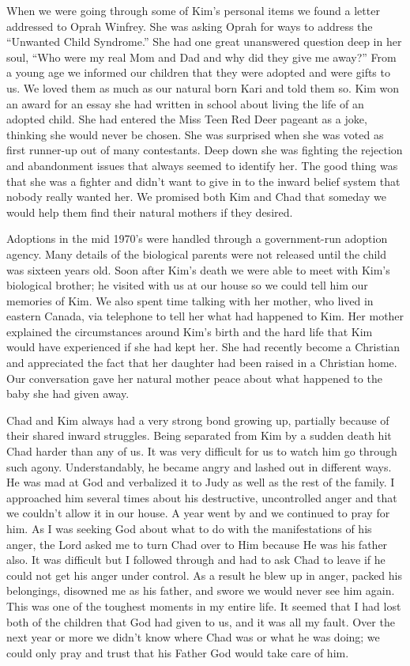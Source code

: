 \documentclass[oneside]{book}
\begin{document}
When we were going through some of Kim's personal items we found a letter addressed to Oprah Winfrey. She was asking Oprah for ways to address the “Unwanted Child Syndrome.” She had one great unanswered question deep in her soul, “Who were my real Mom and Dad and why did they give me away?” From a young age we informed our children that they were adopted and were gifts to us. We loved them as much as our natural born Kari and told them so. Kim won an award for an essay she had written in school about living the life of an adopted child. She had entered the Miss Teen Red Deer pageant as a joke, thinking she would never be chosen. She was surprised when she was voted as first runner-up out of many contestants. Deep down she was fighting the rejection and abandonment issues that always seemed to identify her. The good thing was that she was a fighter and didn't want to give in to the inward belief system that nobody really wanted her. We promised both Kim and Chad that someday we would help them find their natural mothers if they desired. 

Adoptions in the mid 1970’s were handled through a government-run adoption agency. Many details of the biological parents were not released until the child was sixteen years old. Soon after Kim’s death we were able to meet with Kim's biological brother; he visited with us at our house so we could tell him our memories of Kim. We also spent time talking with her mother, who lived in eastern Canada, via telephone to tell her what had happened to Kim. Her mother explained the circumstances around Kim’s birth and the hard life that Kim would have experienced if she had kept her. She had recently become a Christian and appreciated the fact that her daughter had been raised in a Christian home. Our conversation gave her natural mother peace about what happened to the baby she had given away.

Chad and Kim always had a very strong bond growing up, partially because of their shared inward struggles. Being separated from Kim by a sudden death hit Chad harder than any of us. It was very difficult for us to watch him go through such agony. Understandably, he became angry and lashed out in different ways. He was mad at God and verbalized it to Judy as well as the rest of the family. I approached him several times about his destructive, uncontrolled anger and that we couldn’t allow it in our house.  A year went by and we continued to pray for him. As I was seeking God about what to do with the manifestations of his anger, the Lord asked me to turn Chad over to Him because He was his father also. It was difficult but I followed through and had to ask Chad to leave if he could not get his anger under control. As a result he blew up in anger, packed his belongings, disowned me as his father, and swore we would never see him again. This was one of the toughest moments in my entire life. It seemed that I had lost both of the children that God had given to us, and it was all my fault.  Over the next year or more we didn't know where Chad was or what he was doing; we could only pray and trust that his Father God would take care of him.
\end{document}
